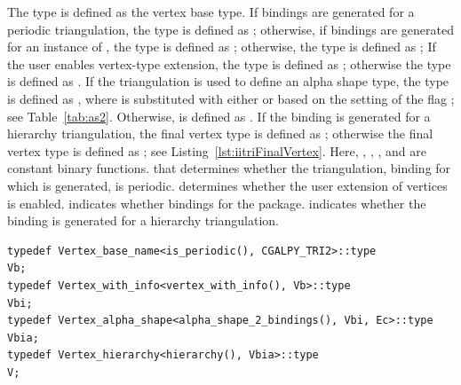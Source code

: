 The type  is defined as the vertex base type.  If
bindings are generated for a periodic triangulation, the type
 is defined as 
;
otherwise, if bindings are generated for an instance of
, the type 
 is defined as
; otherwise, 
the type  is defined as
; 
If the user enables vertex-type extension, the type  
is defined as
; 
otherwise the type  is defined as .
If the triangulation is used to define an alpha shape type, the type 
 is defined as
, 
where  is substituted with either 
 or  based on the setting of the 
\cmake{} flag ; see
Table~\ref{tab:as2}. Otherwise,  is defined as
.
If the binding is generated for a hierarchy triangulation, the final 
vertex type  is defined as
; otherwise
the final vertex type  is defined as ;
see Listing~\ref{lst:iitriFinalVertex}. Here, 
,
,
, and
 are constant binary functions.
 that determines whether the triangulation, 
binding for which is generated, is periodic.
 determines whether the user 
extension of vertices is enabled.
 indicates whether bindings for
the \iiDAlphaShapesPackage{} package.
 indicates whether the binding is generated
for a hierarchy triangulation. 

\begin{lstfloat}
  \begin{lstlisting}[style=cppFramedStyle,basicstyle=\normalsize,%
                     label={lst:iitriFinalVertex},%
                     caption={The final 2D Triangulation vertex type definition.}]
typedef Vertex_base_name<is_periodic(), CGALPY_TRI2>::type           Vb;
typedef Vertex_with_info<vertex_with_info(), Vb>::type               Vbi;
typedef Vertex_alpha_shape<alpha_shape_2_bindings(), Vbi, Ec>::type  Vbia;
typedef Vertex_hierarchy<hierarchy(), Vbia>::type                    V;
  \end{lstlisting}
\end{lstfloat}

